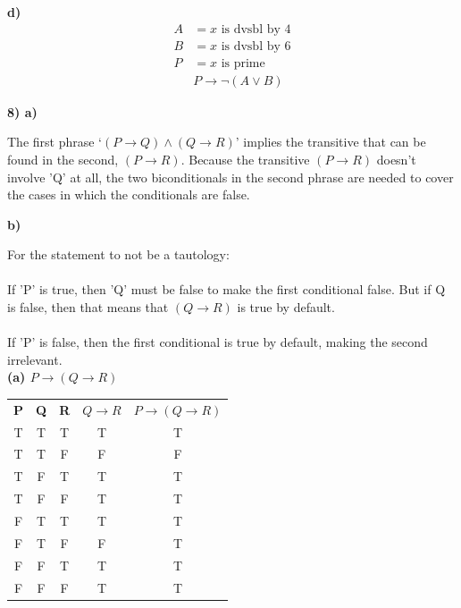 \documentclass[12pt]{exam}
\begin{document}
\textbf{d)}
\begin{align*}
A &= x \text{ is dvsbl by } 4 \\
B &= x \text{ is dvsbl by } 6 \\
P &= x \text{ is prime} \\
&P \to \neg (A \lor B)
\end{align*}

\newpage

\textbf{8) a)}

The first phrase `$(P \to Q) \land (Q \to R)$' implies the transitive that can be found in the second, $(P \to R)$. Because the transitive $(P \to R)$ doesn't involve 'Q' at all, the two biconditionals in the second phrase are needed to cover the cases in which the conditionals are false.

\textbf{b)}

For the statement to not be a tautology:\\
\\
If 'P' is true, then 'Q' must be false to make the first conditional false. But if Q is false, then that means that $(Q \to R)$ is true by default.\\
\\
If 'P' is false, then the first conditional is true by default, making the second irrelevant.\\

\noindent\textbf{(a) $P \rightarrow (Q \rightarrow R)$}
\begin{table}[h]
    \centering 
    \begin{tabular}{ccccc}
        \textbf{P} & \textbf{Q} & \textbf{R} & \textbf{$Q \rightarrow R$} & \textbf{$P \rightarrow (Q \rightarrow R)$} \\
        T & T & T & T & T \\
        T & T & F & F & F \\
        T & F & T & T & T \\
        T & F & F & T & T \\
        F & T & T & T & T \\
        F & T & F & F & T \\
        F & F & T & T & T \\
        F & F & F & T & T \\
    \end{tabular}
\end{table}
\end{document}
